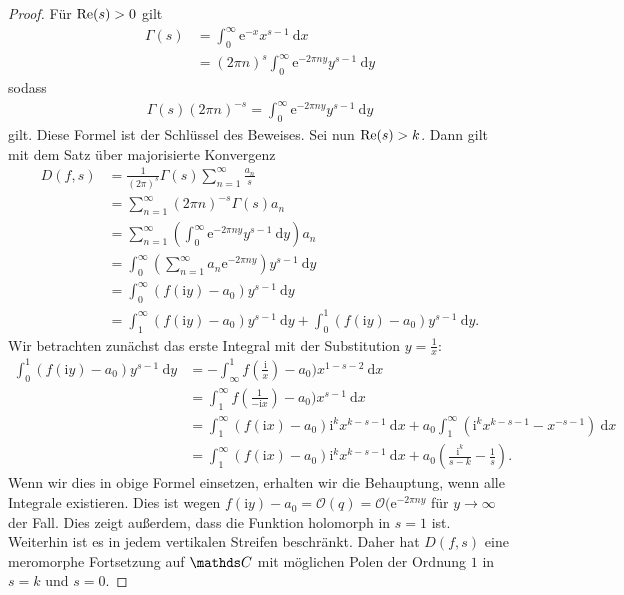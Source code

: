 \begin{proof}
Für $\operatorname{Re}(s)>0$ gilt
\begin{align*}
\Gamma(s)&=\int_0^\infty \mathrm{e}^{-x} x^{s-1}~\mathrm{d}x\\
&=(2\pi n)^s \int_0^\infty \mathrm{e}^{-2\pi ny} y^{s-1}~\mathrm{d}y
\end{align*}
sodass
\begin{align*}
\Gamma(s)(2\pi n)^{-s}=\int_0^\infty \mathrm{e}^{-2\pi ny} y^{s-1}~\mathrm{d}y
\end{align*}
gilt. Diese Formel ist der Schlüssel des Beweises.
Sei nun $\operatorname{Re}(s)>k$.
Dann gilt mit dem Satz über majorisierte Konvergenz
\begin{align*}
D(f,s)&=\frac{1}{(2 \pi)^s} \Gamma(s)\sum_{n=1}^\infty \frac{a_n}{s}\\
&=\sum_{n=1}^\infty (2 \pi n)^{-s} \Gamma(s)a_n\\
&=\sum_{n=1}^\infty \left(\int_0^\infty \mathrm{e}^{-2\pi ny} y^{s-1}~\mathrm{d}y\right)a_n\\
&=\int_0^\infty\left( \sum_{n=1}^\infty a_n \mathrm{e}^{-2\pi ny}\right)y^{s-1}~\mathrm{d}y\\
&=\int_0^\infty (f(\mathrm{i}y)-a_0)y^{s-1}~\mathrm{d}y\\
&=\int_1^\infty (f(\mathrm{i}y)-a_0)y^{s-1}~\mathrm{d}y+\int_0^1 (f(\mathrm{i}y)-a_0)y^{s-1}~\mathrm{d}y.
\end{align*}
Wir betrachten zunächst das erste Integral mit der Substitution $y=\frac{1}{x}$:
\begin{align*}
\int_0^1 (f(\mathrm{i}y)-a_0)y^{s-1}~\mathrm{d}y&=-\int_\infty^1 f\left(\frac{\mathrm{i}}{x}\right)-a_0)x^{1-s-2}~\mathrm{d}x\\
&=\int_1^\infty f\left(\frac{1}{-\mathrm{i}x}\right)-a_0)x^{s-1}~\mathrm{d}x\\
&=\int_1^\infty (f(\mathrm{i}x)-a_0)\mathrm{i}^k x^{k-s-1}~\mathrm{d}x+a_0 \int_1^\infty (\mathrm{i}^k x^{k-s-1}-x^{-s-1})~\mathrm{d}x\\
&=\int_1^\infty (f(\mathrm{i}x)-a_0)\mathrm{i}^k x^{k-s-1}~\mathrm{d}x+a_0\left(\frac{\mathrm{i}^k}{s-k}-\frac{1}{s}\right).
\end{align*}
Wenn wir dies in obige Formel einsetzen, erhalten wir die Behauptung, wenn alle Integrale existieren.
Dies ist wegen $f(\mathrm{i}y)-a_0=\mathcal{O}(q)=\mathcal{O}(\mathrm{e}^{-2\pi ny}$ für $y\to \infty$ der Fall.
Dies zeigt außerdem, dass die Funktion holomorph in $s=1$ ist.
Weiterhin ist es in jedem vertikalen Streifen beschränkt.
Daher hat $D(f,s)$ eine meromorphe Fortsetzung auf $\C$ mit möglichen Polen der Ordnung $1$ in $s=k$ und $s=0$.

\end{proof}
